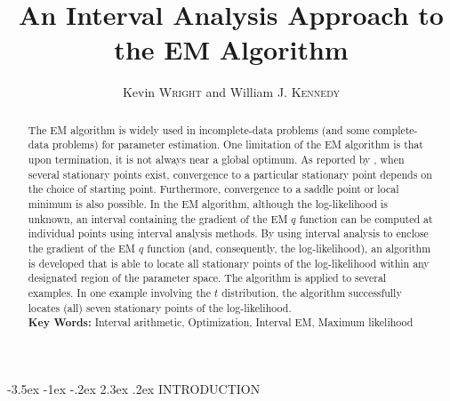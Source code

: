 \documentclass[10pt,twoside]{article}
\makeatletter
\renewcommand\section{\@startsection {section}{1}{\z@}%
                 {-3.5ex \@plus -1ex \@minus -.2ex}%
                 {2.3ex \@plus.2ex}%
                 {\normalfont\centering\bfseries }}
\makeatother
\begin{document}

\def\bfw{ {\bf w}}
\def\bfx{{\bf x}}
\def\bfy{{\bf y}}
\def\bfOmega{\mbox{\boldmath $\Omega$}}
\def\bfphi{\mbox{\boldmath $\phi$}}
\def\bfPhi{\mbox{\boldmath $\Phi$}}
\def\bfpi{\mbox{\boldmath $\pi$}}
\def\bfmu{\mbox{\boldmath $\mu$}}
\def\bfPhi{\mbox{\boldmath $\Phi$}}

\renewcommand\abstractname{}

\renewcommand\refname{REFERENCES}

\title{\bf An Interval Analysis Approach to the EM Algorithm}
\author{Kevin \textsc{Wright} and William J. \textsc{Kennedy}}
\date{}
\maketitle
\begin{abstract}
\vspace{-.4in}
The EM algorithm is widely used in incomplete-data problems (and some
complete-data problems) for parameter estimation.   One limitation of the EM
algorithm is that upon termination, it is not always near a global optimum.
As reported by \cite{WuEM}, when several stationary points exist, 
convergence to a particular stationary point depends on the
choice of starting point.  Furthermore, convergence to a saddle point or
local minimum is also possible.  In the EM algorithm, although the
log-likelihood is unknown, an interval containing 
the gradient of the EM $q$ function can be computed at
individual points using interval analysis methods.  
By using interval analysis to enclose the gradient of the
EM $q$ function (and, consequently, the log-likelihood), an algorithm is
developed that is able to locate all stationary points of the log-likelihood
within any designated region of the parameter space.  The algorithm is
applied
to several examples.  In one example involving the $t$ distribution, the
algorithm successfully locates (all) seven stationary points of the
log-likelihood.\\

{\bf Key Words: } Interval arithmetic, Optimization, Interval EM, Maximum
likelihood 
\end{abstract}


\section{INTRODUCTION \label{sec:introduction}}
\end{document}
